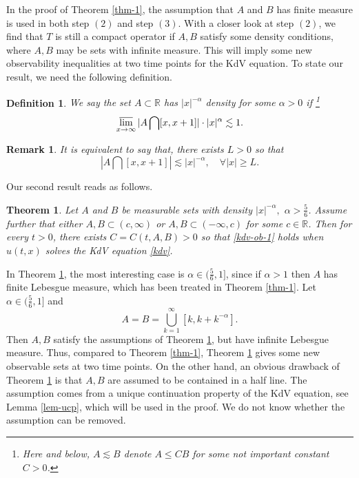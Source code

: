 \documentclass[preprint,12pt]{elsarticle}
\def\R {\mathbb{R}}
\newtheorem{theorem}{Theorem}[section]
\newtheorem{definition}{Definition}[section]
\newtheorem{remark}{Remark}[section]
\begin{document}
In the proof of Theorem \ref{thm-1}, the assumption that $A$ and $B$ has finite measure is used in both step $(2)$ and step $(3)$. With a closer look at step $(2)$, we find that $T$ is still a compact operator if $A,B$ satisfy some density conditions, where $A,B$ may be sets with infinite measure. This will imply some new observability inequalities at two time points for the KdV equation. To state our result, we need the following definition.

%
%

\begin{definition}
    We say the set $A\subset \R$ has $|x|^{-\alpha}$ density for some $\alpha>0$  if \footnote{Here and below, $A\lesssim B$ denote $A\leq CB$ for some not important constant $C>0$.}
    $$
    \varlimsup_{x\to \infty}|A\bigcap[x,x+1]|\cdot|x|^{\alpha}\lesssim 1.
    $$
\end{definition}
\begin{remark}\label{rem-1}
    It is equivalent to say that, there exists $L>0$ so that
    $$
        |A\bigcap[x,x+1]|\lesssim |x|^{-\alpha}, \quad \forall |x|\geq L.
    $$
\end{remark}


Our second result reads as follows.

\begin{theorem}\label{thm-2}
    Let  $A$ and $B$ be measurable sets with density $|x|^{-\alpha},$ $\alpha>\frac{5}{6}$. Assume further that either $A,B\subset (c,\infty)$ or $A,B\subset (-\infty,c)$  for some $c\in\R$. Then for every $t>0$, there exists $C=C(t,A,B)>0$ so that \eqref{kdv-ob-1} holds when $u(t,x)$  solves the KdV equation \eqref{kdv}.
\end{theorem}

In Theorem \ref{thm-2}, the most interesting case is $\alpha\in(\frac{5}{6},1]$, since if $\alpha>1$ then $A$ has finite Lebesgue measure, which has been treated in Theorem \ref{thm-1}. Let $\alpha\in (\frac{5}{6},1]$ and
$$
A=B=\bigcup_{k=1}^\infty [k,k+k^{-\alpha}].
$$
Then $A,B$ satisfy the assumptions of Theorem \ref{thm-2}, but have infinite Lebesgue measure. Thus, compared to Theorem \ref{thm-1}, Theorem \ref{thm-2} gives some new observable sets at two time points. On the other hand, an obvious drawback of Theorem \ref{thm-2} is that   $A,B$ are assumed to be contained in a half line. The assumption comes from a unique continuation property of the KdV equation, see Lemma \ref{lem-ucp}, which will be used in the proof. We do not know whether the assumption can be removed.
\end{document}

